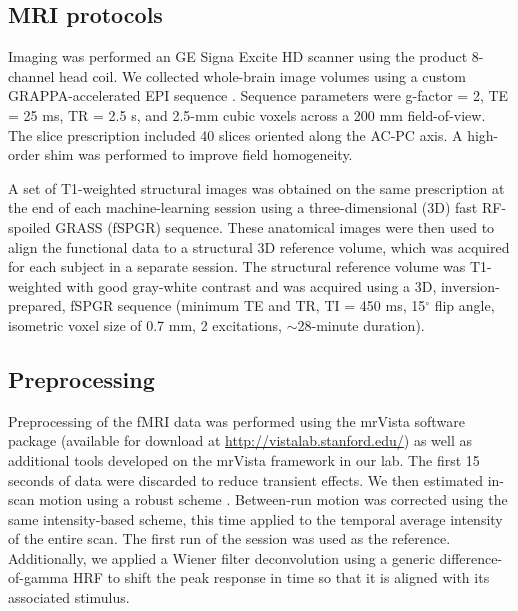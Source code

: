 \documentclass[preprint,5p,authoryear]{elsarticle}
\begin{document}
\subsection{MRI protocols}
Imaging was performed an GE Signa Excite HD scanner using the product 8-channel head coil.
We collected whole-brain image volumes using a custom GRAPPA-accelerated EPI sequence \citep{newbold}. 
Sequence parameters were g-factor = 2,  TE = 25 ms, TR = 2.5 s, and  2.5-mm cubic voxels across a 200 mm field-of-view. 
The slice prescription included 40 slices oriented along the AC-PC axis. 
A high-order shim was  performed to improve field homogeneity.

A set of T1-weighted structural images was obtained on the same prescription at the end of each machine-learning session using a three-dimensional (3D) fast RF-spoiled GRASS (fSPGR) sequence. 
These anatomical images were then used to align the functional data to a structural 3D reference volume, which was acquired for each subject in a separate session. 
The structural reference volume was T1-weighted with good gray-white contrast and was acquired using a 3D, inversion-prepared, fSPGR sequence (minimum TE and TR, TI = 450 ms, 15$^\circ$ flip angle, isometric voxel size of 0.7 mm, 2 excitations, $\sim$28-minute duration).

\subsection{Preprocessing}
Preprocessing of the fMRI data was performed using the mrVista software package (available for download at \url{http://vistalab.stanford.edu/}) as well as additional tools developed on the mrVista framework in our lab. 
The first 15 seconds of data  were discarded to reduce transient effects.
We then estimated in-scan motion using a robust scheme \citep{Nestares-and-Heeger-2000}. 
Between-run motion was corrected using the same intensity-based scheme, this time applied to the temporal average intensity of the entire scan. 
The first run of the session was used as the reference. 
Additionally, we applied a Wiener filter deconvolution \citep{Wiener} using a generic difference-of-gamma HRF \citep{Glover} to shift the peak response in time so that it is aligned with its associated stimulus.
\end{document}
